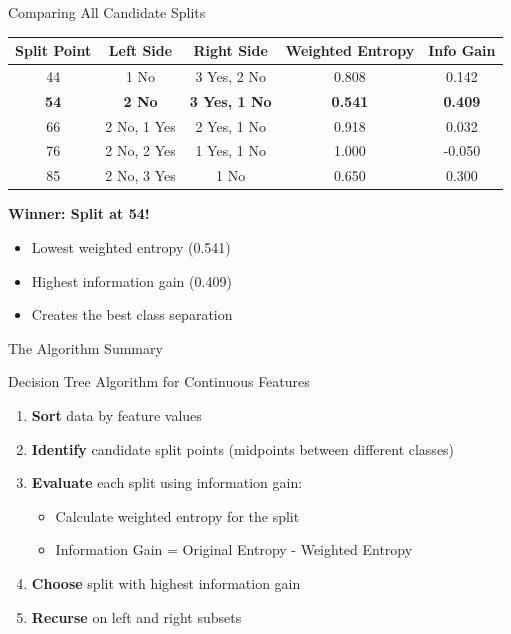 \documentclass[usenames,dvipsnames]{beamer}
\begin{document}
\begin{frame}{Comparing All Candidate Splits}
    \scriptsize

\begin{table}[]
\centering
\begin{tabular}{@{}ccccc@{}}
\toprule
\textbf{Split Point} & \textbf{Left Side} & \textbf{Right Side} & \textbf{Weighted Entropy} & \textbf{Info Gain} \\ \midrule
44 & 1 No & 3 Yes, 2 No & 0.808 & 0.142 \\
\textbf{54} & \textbf{2 No} & \textbf{3 Yes, 1 No} & \textbf{0.541} & \textbf{0.409} \\
66 & 2 No, 1 Yes & 2 Yes, 1 No & 0.918 & 0.032 \\
76 & 2 No, 2 Yes & 1 Yes, 1 No & 1.000 & -0.050 \\
85 & 2 No, 3 Yes & 1 No & 0.650 & 0.300 \\ \bottomrule
\end{tabular}
\end{table}

\begin{keypointsbox}
\textbf{Winner: Split at 54!}
\begin{itemize}
\item Lowest weighted entropy (0.541)
\item Highest information gain (0.409)
\item Creates the best class separation
\end{itemize}
\end{keypointsbox}
\end{frame}

\begin{frame}{The Algorithm Summary}
\begin{definitionbox}{Decision Tree Algorithm for Continuous Features}
\begin{enumerate}
\item \textbf{Sort} data by feature values
\item \textbf{Identify} candidate split points (midpoints between different classes)
\item \textbf{Evaluate} each split using information gain:
   \begin{itemize}
   \item Calculate weighted entropy for the split
   \item Information Gain = Original Entropy - Weighted Entropy
   \end{itemize}
\item \textbf{Choose} split with highest information gain
\item \textbf{Recurse} on left and right subsets
\end{enumerate}
\end{definitionbox}

\end{frame}
\end{document}

